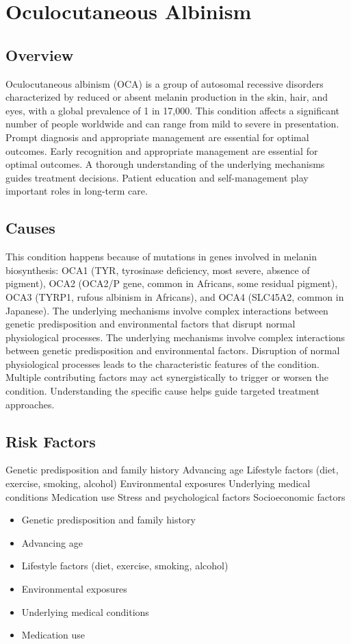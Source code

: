 \chapter{Oculocutaneous Albinism}
\label{sec:Oculocutaneous Albinism}

\section{Overview}
Oculocutaneous albinism (OCA) is a group of autosomal recessive disorders characterized by reduced or absent melanin production in the skin, hair, and eyes, with a global prevalence of 1 in 17,000. This condition affects a significant number of people worldwide and can range from mild to severe in presentation. Prompt diagnosis and appropriate management are essential for optimal outcomes. Early recognition and appropriate management are essential for optimal outcomes. A thorough understanding of the underlying mechanisms guides treatment decisions. Patient education and self-management play important roles in long-term care.
\section{Causes}
This condition happens because of mutations in genes involved in melanin biosynthesis: OCA1 (TYR, tyrosinase deficiency, most severe, absence of pigment), OCA2 (OCA2/P gene, common in Africans, some residual pigment), OCA3 (TYRP1, rufous albinism in Africans), and OCA4 (SLC45A2, common in Japanese). The underlying mechanisms involve complex interactions between genetic predisposition and environmental factors that disrupt normal physiological processes. The underlying mechanisms involve complex interactions between genetic predisposition and environmental factors. Disruption of normal physiological processes leads to the characteristic features of the condition. Multiple contributing factors may act synergistically to trigger or worsen the condition. Understanding the specific cause helps guide targeted treatment approaches.
\section{Risk Factors}
Genetic predisposition and family history Advancing age Lifestyle factors (diet, exercise, smoking, alcohol) Environmental exposures Underlying medical conditions Medication use Stress and psychological factors Socioeconomic factors

\begin{itemize}[noitemsep]
  \item Genetic predisposition and family history
  \item Advancing age
  \item Lifestyle factors (diet, exercise, smoking, alcohol)
  \item Environmental exposures
  \item Underlying medical conditions
  \item Medication use
\end{itemize}
